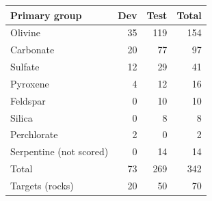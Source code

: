 \begin{tabular}{lrrr}
\toprule
Primary group & Dev & Test & Total\\
\midrule
Olivine & 35 & 119 & 154\\
Carbonate & 20 & 77 & 97\\
Sulfate & 12 & 29 & 41\\
Pyroxene & 4 & 12 & 16\\
Feldspar & 0 & 10 & 10\\
Silica & 0 & 8 & 8\\
Perchlorate & 2 & 0 & 2\\
Serpentine (not scored) & 0 & 14 & 14\\
\midrule
Total & 73 & 269 & 342\\
Targets (rocks) & 20 & 50 & 70\\
\bottomrule
\end{tabular}
